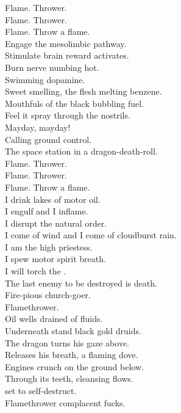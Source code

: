 Flame. Thrower. \\
Flame. Thrower. \\
Flame. Throw a flame. \\

Engage the mesolimbic pathway. \\
Stimulate brain reward activates. \\
Burn nerve numbing hot. \\
Swimming dopamine. \\
Sweet smelling, the flesh melting benzene. \\
Mouthfuls of the black bubbling fuel. \\
Feel it spray through the  nostrils. \\
Mayday, mayday! \\
Calling ground control. \\
The space station in a dragon-death-roll. \\

Flame. Thrower. \\
Flame. Thrower. \\
Flame. Throw a flame. \\

I drink lakes of motor oil. \\
I engulf and I inflame. \\
I disrupt the natural order. \\
I come of wind and I come of cloudburst rain. \\
I am the high priestess. \\
I spew motor spirit breath. \\
I will torch the . \\
The last enemy to be destroyed is death. \\
Fire-pious church-goer. \\
Flamethrower. \\

Oil wells drained of fluids. \\
Underneath stand black gold druids. \\
The dragon turns his gaze above. \\
Releases his breath, a flaming dove. \\
Engines crunch on the ground below. \\
Through its teeth, cleansing  flows. \\
 set to self-destruct. \\
Flamethrower complacent fucks. \\

